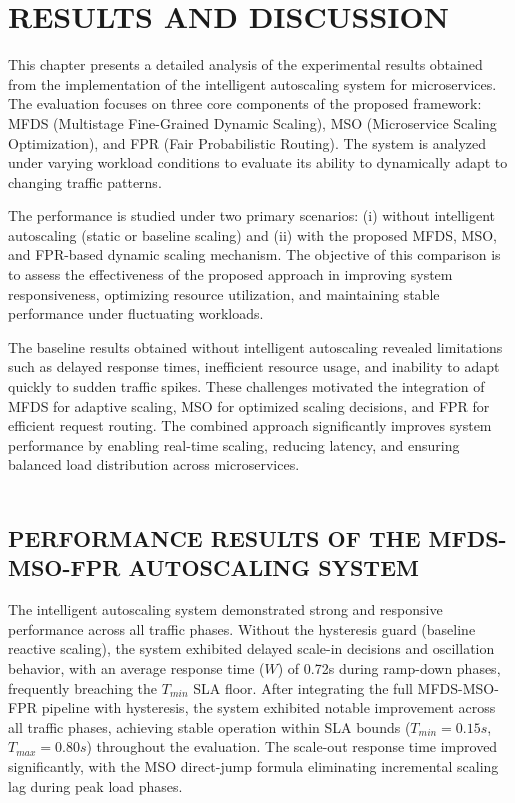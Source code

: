\chapter{RESULTS AND DISCUSSION}
\begin{sloppypar}
    
This chapter presents a detailed analysis of the experimental results obtained from the implementation of the intelligent autoscaling system for microservices. The evaluation focuses on three core components of the proposed framework: MFDS (Multistage Fine-Grained Dynamic Scaling), MSO (Microservice Scaling Optimization), and FPR (Fair Probabilistic Routing). The system is analyzed under varying workload conditions to evaluate its ability to dynamically adapt to changing traffic patterns.

The performance is studied under two primary scenarios: (i) without intelligent autoscaling (static or baseline scaling) and (ii) with the proposed MFDS, MSO, and FPR-based dynamic scaling mechanism. The objective of this comparison is to assess the effectiveness of the proposed approach in improving system responsiveness, optimizing resource utilization, and maintaining stable performance under fluctuating workloads.

The baseline results obtained without intelligent autoscaling revealed limitations such as delayed response times, inefficient resource usage, and inability to adapt quickly to sudden traffic spikes. These challenges motivated the integration of MFDS for adaptive scaling, MSO for optimized scaling decisions, and FPR for efficient request routing. The combined approach significantly improves system performance by enabling real-time scaling, reducing latency, and ensuring balanced load distribution across microservices.\\\\
\end{sloppypar}

\section{\uppercase{Performance Results of the MFDS-MSO-FPR Autoscaling System}}

The intelligent autoscaling system demonstrated strong and responsive performance 
across all traffic phases. Without the hysteresis guard (baseline reactive scaling), 
the system exhibited delayed scale-in decisions and oscillation behavior, with an 
average response time ($W$) of 0.72s during ramp-down phases, frequently breaching 
the $T_{min}$ SLA floor. After integrating the full MFDS-MSO-FPR pipeline with 
hysteresis, the system exhibited notable improvement across all traffic phases, 
achieving stable operation within SLA bounds ($T_{min} = 0.15s$, $T_{max} = 0.80s$) 
throughout the evaluation. The scale-out response time improved significantly, with 
the MSO direct-jump formula eliminating incremental scaling lag during peak load phases.

